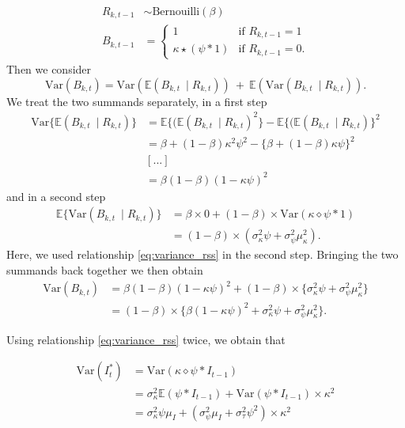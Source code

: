 \documentclass{article}
\begin{document}
\begin{align}
R_{k, t - 1} & \sim \text{Bernouilli}(\beta)\\
B_{k, t - 1} & = \begin{cases}
1 & \text{if } R_{k, t - 1} = 1\\ %
\kappa \star (\psi * 1) & \text{if } R_{k, t - 1} = 0. %
\label{eq:Z_t_i}
\end{cases}
\end{align} 
Then we consider
$$
\text{Var}(B_{k, t}) = \text{Var}(\mathbb{E}(B_{k, t} \ \mid R_{k, t})) \ + \ \mathbb{E}(\text{Var}(B_{k, t} \ \mid R_{k, t})).
$$
We treat the two summands separately, in a first step
\begin{align*}
\text{Var}\{\mathbb{E}(B_{k, t} \ \mid R_{k, t})\} & = \mathbb{E}\{(\mathbb{E}(B_{k, t} \ \mid R_{k, t})^2\} - \mathbb{E}\{(\mathbb{E}(B_{k, t} \ \mid R_{k, t})\}^2\\
& = \beta + (1 - \beta)\kappa^2\psi^2 - \{\beta + (1 - \beta)\kappa\psi\}^2\\
& [...]\\
& = \beta(1 - \beta)(1 - \kappa\psi)^2
\end{align*}
and in a second step
\begin{align*}
\mathbb{E}\{\text{Var}(B_{k, t} \ \mid R_{k, t})\} & = \beta \times 0 + (1 - \beta)\times \text{Var}(\kappa \diamond \psi * 1)\\
& = (1 - \beta) \times (\sigma^2_\kappa\psi + \sigma^2_\psi\mu_\kappa^2).
\end{align*}
Here, we used relationship \eqref{eq:variance_rss} in the second step. Bringing the two summands back together we then obtain
\begin{align*}
\text{Var}(B_{k, t}) & = \beta(1 - \beta)(1 - \kappa\psi)^2 + (1 - \beta) \times \{\sigma^2_\kappa\psi + \sigma^2_\psi\mu_\kappa^2\}\\
& = (1 - \beta) \times \{\beta (1 - \kappa\psi)^2 + \sigma^2_\kappa\psi + \sigma^2_\psi\mu_\kappa^2\}.
\end{align*}

Using relationship \eqref{eq:variance_rss} twice, we obtain that

\begin{align*}
\text{Var}(I^*_t) & = \text{Var}(\kappa \diamond \psi * I_{t - 1})\\
& = \sigma^2_\kappa \mathbb{E}(\psi * I_{t - 1}) + \text{Var}(\psi * I_{t - 1}) \times \kappa^2\\
& = \sigma^2_\kappa\psi \mu_I + (\sigma^2_\psi\mu_I + \sigma^2_\tau\psi^2)\times\kappa^2
\end{align*}
\end{document}

